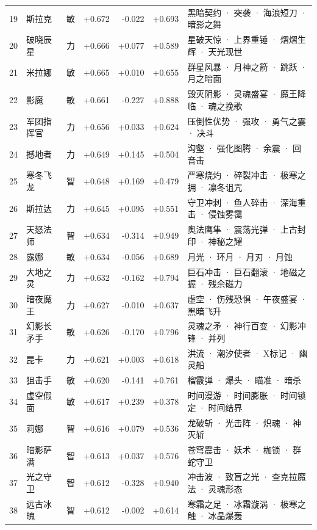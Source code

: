 \documentclass[10pt,a4paper]{article}
\begin{document}
{\begin{longtable}{@{}rlcrrrp{7.6cm}@{}}
19 & 斯拉克 & 敏 & +0.672 & -0.022 & +0.693 & \small 黑暗契约 · 突袭 · 海浪短刀 · 暗影之舞 \\
20 & 破晓辰星 & 力 & +0.666 & +0.077 & +0.589 & \small 星破天惊 · 上界重锤 · 熠熠生辉 · 天光现世 \\
21 & 米拉娜 & 敏 & +0.665 & +0.010 & +0.655 & \small 群星风暴 · 月神之箭 · 跳跃 · 月之暗面 \\
22 & 影魔 & 敏 & +0.661 & -0.227 & +0.888 & \small 毁灭阴影 · 灵魂盛宴 · 魔王降临 · 魂之挽歌 \\
23 & 军团指挥官 & 力 & +0.656 & +0.033 & +0.624 & \small 压倒性优势 · 强攻 · 勇气之霎 · 决斗 \\
24 & 撼地者 & 力 & +0.649 & +0.145 & +0.504 & \small 沟壑 · 强化图腾 · 余震 · 回音击 \\
25 & 寒冬飞龙 & 智 & +0.648 & +0.169 & +0.479 & \small 严寒烧灼 · 碎裂冲击 · 极寒之拥 · 凛冬诅咒 \\
26 & 斯拉达 & 力 & +0.645 & +0.095 & +0.551 & \small 守卫冲刺 · 鱼人碎击 · 深海重击 · 侵蚀雾霭 \\
27 & 天怒法师 & 智 & +0.634 & -0.314 & +0.949 & \small 奥法鹰隼 · 震荡光弹 · 上古封印 · 神秘之耀 \\
28 & 露娜 & 敏 & +0.634 & -0.056 & +0.689 & \small 月光 · 环月 · 月刃 · 月蚀 \\
29 & 大地之灵 & 力 & +0.632 & -0.162 & +0.794 & \small 巨石冲击 · 巨石翻滚 · 地磁之握 · 残余磁力 \\
30 & 暗夜魔王 & 力 & +0.627 & -0.010 & +0.637 & \small 虚空 · 伤残恐惧 · 午夜盛宴 · 黑暗飞升 \\
31 & 幻影长矛手 & 敏 & +0.626 & -0.170 & +0.796 & \small 灵魂之矛 · 神行百变 · 幻影冲锋 · 并列 \\
32 & 昆卡 & 力 & +0.621 & +0.003 & +0.618 & \small 洪流 · 潮汐使者 · X标记 · 幽灵船 \\
33 & 狙击手 & 敏 & +0.620 & -0.141 & +0.761 & \small 榴霰弹 · 爆头 · 瞄准 · 暗杀 \\
34 & 虚空假面 & 敏 & +0.617 & +0.239 & +0.378 & \small 时间漫游 · 时间膨胀 · 时间锁定 · 时间结界 \\
35 & 莉娜 & 智 & +0.616 & +0.079 & +0.536 & \small 龙破斩 · 光击阵 · 炽魂 · 神灭斩 \\
36 & 暗影萨满 & 智 & +0.613 & +0.037 & +0.576 & \small 苍穹震击 · 妖术 · 枷锁 · 群蛇守卫 \\
37 & 光之守卫 & 智 & +0.612 & -0.328 & +0.940 & \small 冲击波 · 致盲之光 · 查克拉魔法 · 灵魂形态 \\
38 & 远古冰魄 & 智 & +0.612 & -0.002 & +0.614 & \small 寒霜之足 · 冰霜漩涡 · 极寒之触 · 冰晶爆轰 \\

\end{longtable}}
\end{document}

